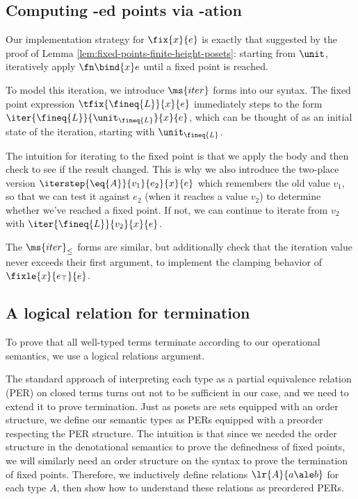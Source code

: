 
\subsection{Computing -ed points via -ation}

Our implementation strategy for $\fix{x}{e}$ is exactly that suggested by the
proof of Lemma \ref{lem:fixed-points-finite-height-posets}: starting from
$\unit$, iteratively apply $\fn\bind{x} e$ until a fixed point is
reached.

To model this iteration, we introduce $\ms{iter}$ forms into our
syntax.  The fixed point expression $\tfix{\fineq{L}}{x}{e}$
immediately steps to the form
$\iter{\fineq{L}}{\unit_{\fineq{L}}}{x}{e}$, which can be thought of
as an initial state of the iteration, starting with $\unit_{\fineq{L}}$.

The intuition for iterating to the fixed point is that we apply the 
body and then check to see if the result changed. This is why we also 
introduce the two-place version $\iterstep{\eq{A}}{v_1}{e_2}{x}{e}$ 
which remembers the old value $v_1$, so that we can test it against $e_2$ (when it
reaches a value $v_2$) to determine
whether we've reached a fixed point. If not, we can continue to iterate from
$v_2$ with $\iter{\fineq{L}}{v_2}{x}{e}$. 

The $\ms{iter}_\le$ forms are similar, but additionally check that the iteration
value never exceeds their first argument, to implement the clamping behavior of
$\fixle{x}{e_\top}{e}$.


\subsection{A logical relation for termination}

To prove that all well-typed terms terminate according to our operational
semantics, we use a logical relations argument.

The standard approach of interpreting each type as a partial equivalence
relation (PER) on closed terms turns out not to be sufficient in our case, and
we need to extend it to prove termination. Just as posets are sets equipped with
an order structure, we define our semantic types as PERs equipped with a
preorder respecting the PER structure. The intuition is that since we needed the
order structure in the denotational semantics to prove the definedness of fixed
points, we will similarly need an order structure on the syntax to prove the
termination of fixed points. Therefore, we inductively define relations
$\lr{A}{a \ale b}$ for each type $A$, then show how to understand these
relations as preordered PERs.

